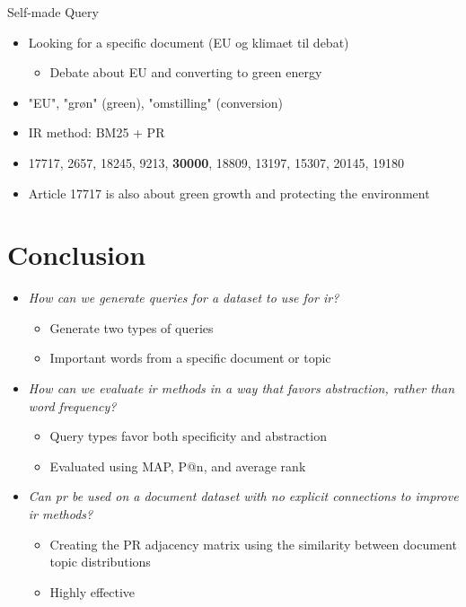\begin{frame}{\insertsection}{\insertsubsection}
	\begin{block}{Self-made Query}
	    \begin{itemize}
	        \item<1-> Looking for a specific document (EU og klimaet til debat)
	        \begin{itemize}
	            \item<1-> Debate about EU and converting to green energy
	        \end{itemize}
	        \item<2-> "EU", "grøn" (green), "omstilling" (conversion)
	        \item<3-> IR method: BM25 + PR
	        \item<4-> 17717, 2657, 18245, 9213, \textbf{30000}, 18809, 13197, 15307, 20145, 19180
	        \item<5-> Article 17717 is also about green growth and protecting the environment
	    \end{itemize}
	\end{block}
\end{frame}


\section{Conclusion}
\begin{frame}{\insertsection}{}
	\begin{itemize}
		\item \emph{How can we generate queries for a dataset to use for \acrshort{ir}?}
		\begin{itemize}
			\item<2-> Generate two types of queries
			\item<2-> Important words from a specific document or topic
		\end{itemize}
	\vspace{.2cm}
		\item \emph{How can we evaluate \acrshort{ir} methods in a way that favors abstraction, rather than word frequency?}
		\begin{itemize}
			\item<3-> Query types favor both specificity and abstraction
			\item<3-> Evaluated using MAP, P@n, and average rank
		\end{itemize}
	\vspace{.2cm}
		\item \emph{Can \acrshort{pr} be used on a document dataset with no explicit connections to improve \acrshort{ir} methods?}
		\begin{itemize}
			\item<4-> Creating the PR adjacency matrix using the similarity between document topic distributions
			\item<4-> Highly effective
		\end{itemize}
	\end{itemize}
\end{frame}